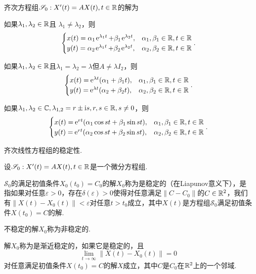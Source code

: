 \begin{remark}
  齐次方程组$\mathscr S_0:X'(t)=AX(t),t\in\mathbb R$的解为
  \begin{enum}
    \item 如果$\lambda_1,\lambda_2\in\mathbb R$且
        $\lambda_1\ne\lambda_2 $，则
        \[
          \begin{cases}
            x(t) = \alpha_1\ee^{\lambda_1t} + \beta_1\ee^{\lambda_2t}, & \alpha_1,\beta_1 \in\MR,t\in\MR \\
            y(t) = \alpha_2\ee^{\lambda_1t}+\beta_2
            \ee^{\lambda_2t}, & \alpha_2,\beta_2\in\MR,t\in\MR
          \end{cases}.
        \]
    \item 如果$\lambda_1,\lambda_2\in\mathbb R$且$\lambda_1
        =\lambda_2=\lambda$但$A\ne\lambda I_2$，则
        \[
          \begin{cases}
            x(t)= \operatorname{\!\!\;\mathrm e}^{\lambda t}(\alpha_1+\beta_1t), & \alpha_1,\beta_1 \in\mathbb R,t\in\mathbb R \\
            y(t) = \operatorname{\!\!\;\mathrm e}^{\lambda t}(\alpha_2+\beta_2t), & \alpha_2,\beta_2\in\mathbb R,t\in\mathbb R
          \end{cases}.
        \]
    \item 如果$\lambda_1,\lambda_2\in\mathbb C,\lambda_{1,2}=r\pm\mathrm i s,r,s\in\mathbb R,s\ne0$，则
        \[
          \begin{cases}
            x(t) = \operatorname{\!\!\;\mathrm e}^{rt}(\alpha_1\cos st + \beta_1\sin st), & \alpha_1,\beta_1 \in\mathbb R,t\in\mathbb R \\
            y(t) = \operatorname{\!\!\;\mathrm e}^{rt}(\alpha_2\cos st + \beta_2\sin st), & \alpha_2,\beta_2\in\mathbb R,t\in\mathbb R
          \end{cases}.
        \]
  \end{enum}
\end{remark}

\begin{definition}{\kaishu 齐次线性方程组的稳定性.}

  设$\mathscr S_0:X'(t)=AX(t),t\in\mathbb R$是一个微分方程组.

  \begin{enum}
    \item $\mathscr S_0$的满足初值条件$X_0(t_0)=C_0$的解$X_0$称为是{\kaishu 稳定的（在Liapunov意义下）}，是指如果对任意$\varepsilon>0$，存在$\delta(\varepsilon)>0$使得对任意满足$\|C-C_0\|$的$C\in\mathbb R^2$，我们有$\|X(t)-X_0(t)\|<\varepsilon$对任意$t>t_0$成立，其中$X(t)$是方程组$\mathscr S_0$满足初值条件$X(t_0)=C$的解.
    \item 不稳定的解$X_0$称为{\kaishu 非稳定的}.
    \item 解$X_0$称为是{\kaishu 渐近稳定的}，如果它是稳定的，且
        \[
          \lim_{t\to\infty}\|X(t) - X_0(t) \| =0
        \]
        对任意满足初值条件$X(t_0)=C$的解$X$成立，其中$C$是$C_0$在$\mathbb R^2$上的一个邻域.
  \end{enum}
\end{definition}

